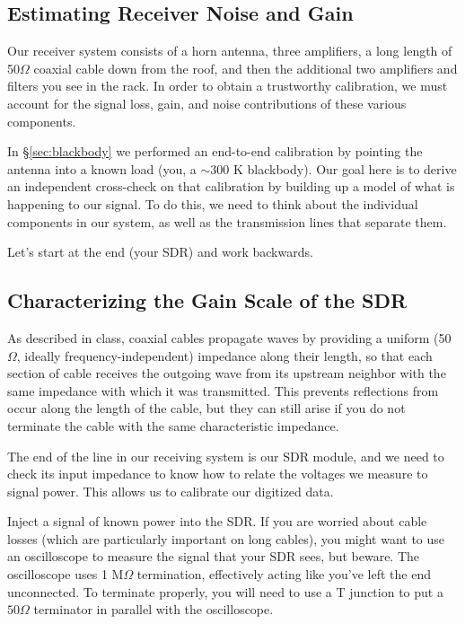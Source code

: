 \documentclass[11pt,preprint]{aastex}
\begin{document}
\subsection{Estimating Receiver Noise and Gain}

Our receiver system consists of a horn antenna, three amplifiers,
a long length of 50$\Omega$
coaxial cable down from the roof, and then the additional two amplifiers and 
filters you see in the rack. In order to obtain a trustworthy calibration,
we must account for the signal loss, gain, and noise
contributions of these various components.

In \S\ref{sec:blackbody} we performed an end-to-end calibration by pointing the antenna into
a known load (you, a $\sim$300 K blackbody). Our goal here is to derive an 
independent cross-check on that calibration by building up 
a model of what is happening to our signal.
To do this, we need to think about the individual components in our system,
as well as the transmission lines that separate them.

Let's start at the end (your SDR) and work backwards.

\subsection{Characterizing the Gain Scale of the SDR}
\label{sec:termination}

As described in class, coaxial cables propagate waves by
providing a uniform (50$\Omega$, ideally frequency-independent) impedance 
along their length, so that each
section of cable receives the outgoing wave from its upstream neighbor
with the same impedance with which it was transmitted. This prevents reflections
from occur along the length of the cable, but they can still arise 
if you do not terminate the cable with the same characteristic impedance.

The end of the line in our receiving system is our SDR module, and we need to
check its input impedance to know how to relate the voltages we measure
to signal power. 
This allows us to calibrate our digitized data.

Inject a signal of known power into the SDR. If you are worried about
cable losses (which are particularly important on long cables), you
might want to use an oscilloscope to measure the signal that your SDR
sees, but beware. The oscilloscope uses 1 M$\Omega$ termination, effectively
acting like you've left the end unconnected. To terminate properly, you will
need to use a T junction to put a $50\Omega$ terminator in parallel with
the oscilloscope.
\end{document}
